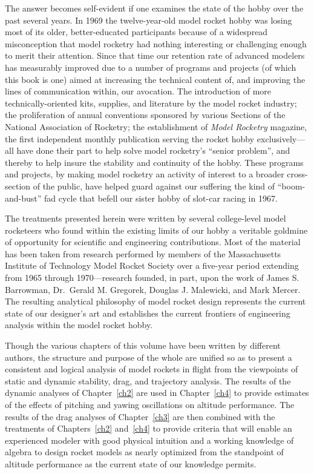 The answer becomes self-evident if one examines the state of the hobby over the past several years. In 1969
the twelve-year-old model rocket hobby was losing most of its older, better-educated participants because of a
widespread misconception that model rocketry had nothing interesting or challenging enough to merit their
attention. Since that time our retention rate of advanced modelers has measurably improved due to a number of
programs and projects (of which this book is one) aimed at increasing the technical content of, and improving
the lines of communication within, our avocation. The introduction of more technically-oriented kits,
supplies, and literature by the model rocket industry; the proliferation of annual conventions sponsored by
various Sections of the National Association of Rocketry; the establishment of \emph{Model Rocketry} magazine,
the first independent monthly publication serving the rocket hobby exclusively---all have done their part to
help solve model rocketry's ``senior problem'', and thereby to help insure the stability and continuity of the
hobby. These programs and projects, by making model rocketry an activity of interest to a broader
cross-section of the public, have helped guard against our suffering the kind of ``boom-and-bust'' fad cycle
that befell our sister hobby of slot-car racing in 1967.

The treatments presented herein were written by several college-level model rocketeers who found within the
existing limits of our hobby a veritable goldmine of opportunity for scientific and engineering contributions.
Most of the material has been taken from research performed by members of the Massachusetts Institute of
Technology Model Rocket Society over a five-year period extending from 1965 through 1970---research founded,
in part, upon the work of James S. Barrowman, Dr.~Gerald M. Gregorek, Douglas J. Malewicki, and Mark Mercer.
The resulting analytical philosophy of model rocket design represents the current state of our designer's art
and establishes the current frontiers of engineering analysis within the model rocket hobby.

Though the various chapters of this volume have been written by different authors, the structure and purpose
of the whole are unified so as to present a consistent and logical analysis of model rockets in flight from
the viewpoints of static and dynamic stability, drag, and trajectory analysis. The results of the dynamic
analyses of Chapter~\ref{ch2} are used in Chapter~\ref{ch4} to provide estimates of the effects of pitching and
yawing oscillations on altitude performance. The results of the drag analyses of Chapter~\ref{ch3} are then
combined with the treatments of Chapters~\ref{ch2} and~\ref{ch4} to provide criteria that will enable an
experienced modeler with good physical intuition and a working knowledge of algebra to design rocket models as
nearly optimized from the standpoint of altitude performance as the current state of our knowledge permits.

